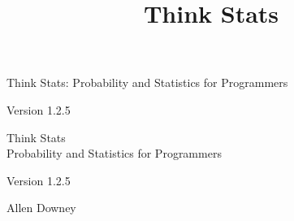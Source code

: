 \documentclass[12pt]{book}
\title{Think Stats}
\newcommand{\theversion}{1.2.5}
\begin{document}
\frontmatter




\newtheorem{ex}{Exercise}[chapter]

\begin{latexonly}

\renewcommand{\blankpage}{\thispagestyle{empty} \quad \newpage}



\thispagestyle{empty}

\begin{flushright}
\vspace*{2.0in}

\begin{spacing}{3}
{\huge Think Stats: Probability and Statistics for Programmers}\\
{\Large }
\end{spacing}

\vspace{0.25in}

Version \theversion

\vfill

\end{flushright}


\blankpage
\blankpage

\pagebreak
\thispagestyle{empty}

\begin{flushright}
\vspace*{2.0in}

\begin{spacing}{3}
{\huge Think Stats}\\
{\Large Probability and Statistics for Programmers}
\end{spacing}

\vspace{0.25in}

Version \theversion

\vspace{1in}


{\Large
Allen Downey\\
}



\end{flushright}
\end{latexonly}
\end{document}
